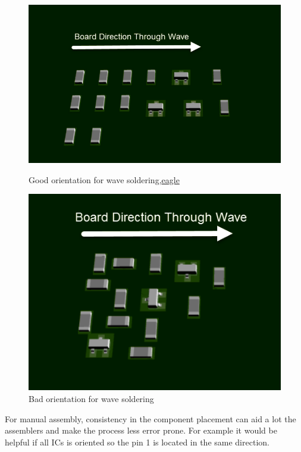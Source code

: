 \documentclass[12pt]{article}
\begin{document}
\begin{itemize}
	\begin{figure}[h!]
		\centering
		\begin{minipage}[b]{0.4\textwidth}
			\includegraphics[width=\textwidth]{assets/good_wave.png}
			\caption{Good orientation for wave soldering,\href{https://www.autodesk.com/products/eagle/blog/top-10-pcb-component-placement-tips-pcb-beginner/}{eagle}} 
		\end{minipage}
		\hfill
		\begin{minipage}[b]{0.4\textwidth}
			\includegraphics[width=\textwidth]{assets/bad_wave.png}
			\caption{Bad orientation for wave soldering}
		\end{minipage}
	\end{figure}
	
	For manual assembly, consistency in the component placement can aid a lot the assemblers and make the process less error prone. For example it would be helpful if all ICs is oriented so the pin 1 is located in the same direction.
	

\end{itemize}
\end{document}
